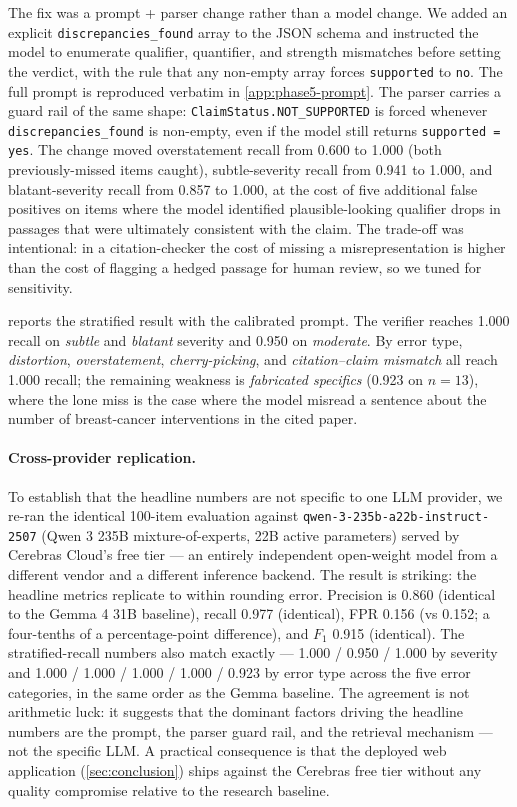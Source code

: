 \documentclass[12pt]{article}
\begin{document}
The fix was a prompt + parser change rather than a model change. We added an explicit \texttt{discrepancies\_found} array to the JSON schema and instructed the model to enumerate qualifier, quantifier, and strength mismatches before setting the verdict, with the rule that any non-empty array forces \texttt{supported} to \texttt{no}. The full prompt is reproduced verbatim in \cref{app:phase5-prompt}. The parser carries a guard rail of the same shape: \texttt{ClaimStatus.NOT\_SUPPORTED} is forced whenever \texttt{discrepancies\_found} is non-empty, even if the model still returns \texttt{supported = yes}. The change moved overstatement recall from 0.600 to 1.000 (both previously-missed items caught), subtle-severity recall from 0.941 to 1.000, and blatant-severity recall from 0.857 to 1.000, at the cost of five additional false positives on items where the model identified plausible-looking qualifier drops in passages that were ultimately consistent with the claim. The trade-off was intentional: in a citation-checker the cost of missing a misrepresentation is higher than the cost of flagging a hedged passage for human review, so we tuned for sensitivity.

 reports the stratified result with the calibrated prompt. The verifier reaches 1.000 recall on \textit{subtle} and \textit{blatant} severity and 0.950 on \textit{moderate}. By error type, \textit{distortion}, \textit{overstatement}, \textit{cherry-picking}, and \textit{citation--claim mismatch} all reach 1.000 recall; the remaining weakness is \textit{fabricated specifics} (0.923 on $n=13$), where the lone miss is the case where the model misread a sentence about the number of breast-cancer interventions in the cited paper.

\paragraph{Cross-provider replication.} To establish that the headline numbers are not specific to one LLM provider, we re-ran the identical 100-item evaluation against \texttt{qwen-3-235b-a22b-instruct-2507} (Qwen 3 235B mixture-of-experts, 22B active parameters) served by Cerebras Cloud's free tier --- an entirely independent open-weight model from a different vendor and a different inference backend. The result is striking: the headline metrics replicate to within rounding error. Precision is 0.860 (identical to the Gemma 4 31B baseline), recall 0.977 (identical), FPR 0.156 (vs 0.152; a four-tenths of a percentage-point difference), and $F_1$ 0.915 (identical). The stratified-recall numbers also match exactly --- 1.000 / 0.950 / 1.000 by severity and 1.000 / 1.000 / 1.000 / 1.000 / 0.923 by error type across the five error categories, in the same order as the Gemma baseline. The agreement is not arithmetic luck: it suggests that the dominant factors driving the headline numbers are the prompt, the parser guard rail, and the retrieval mechanism --- not the specific LLM. A practical consequence is that the deployed web application (\cref{sec:conclusion}) ships against the Cerebras free tier without any quality compromise relative to the research baseline.
\end{document}
